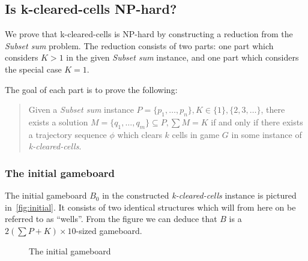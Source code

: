 \subsection{Is k-cleared-cells NP-hard?}

We prove that k-cleared-cells is NP-hard by constructing a reduction from the \textit{Subset sum} problem. The reduction consists of two parts: one part which considers $K > 1$ in the given \textit{Subset sum} instance, and one part which considers the special case $K = 1$.

The goal of each part is to prove the following: 

\begin{quote}
Given a \textit{Subset sum} instance $P = \{p_1, \ldots, p_n\}, K \in \{1\} ,\{2, 3, \ldots \}$, there exists a solution $M = \{q_1, \ldots, q_m \} \subseteq P, \sum M = K$ if and only if there exists a trajectory sequence $\phi$ which clears $k$ cells in game $G$ in some instance of \textit{k-cleared-cells}.
\end{quote}

\subsubsection{The initial gameboard}

The initial gameboard $B_0$ in the constructed \textit{k-cleared-cells} instance is pictured in~\autoref{fig:initial}. It consists of two identical structures which will from here on be referred to as ``wells''. From the figure we can deduce that $B$ is a $2 \left( \sum P + K \right) \times 10$-sized gameboard.

\begin{figure}[H]
    \centering
    \caption{The initial gameboard}
    \label{fig:initial}
\end{figure}

